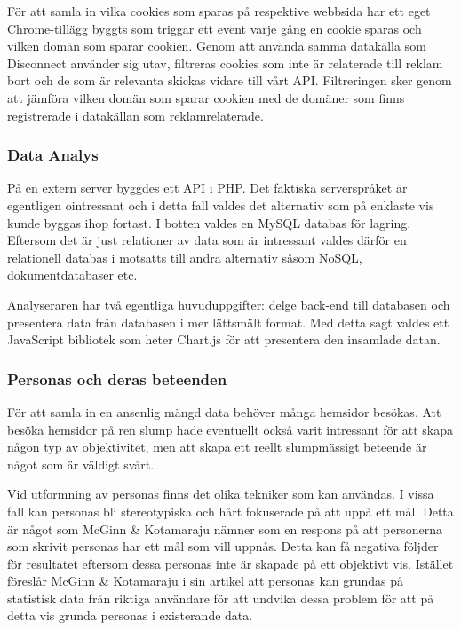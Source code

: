 \documentclass[a4paper,11pt]{article}
\begin{document}
{För att samla in vilka cookies som sparas på respektive webbsida har ett eget Chrome-tillägg byggts som triggar ett event varje gång en cookie sparas och vilken domän som sparar cookien. Genom att använda samma datakälla som Disconnect använder sig utav, filtreras cookies som inte är relaterade till reklam bort och de som är relevanta skickas vidare till vårt API. Filtreringen sker genom att jämföra vilken domän som sparar cookien med de domäner som finns registrerade i datakällan som reklamrelaterade.

\subsubsection{Data Analys}
På en extern server byggdes ett API i PHP. Det faktiska serverspråket är egentligen  ointressant och i detta fall valdes det alternativ som på enklaste vis kunde byggas ihop fortast. I botten valdes en MySQL databas för lagring. Eftersom det är just relationer av data som är intressant valdes därför en relationell databas i motsatts till andra alternativ såsom NoSQL, dokumentdatabaser etc. 

Analyseraren har två egentliga huvuduppgifter: delge back-end till databasen och presentera data från databasen i mer lättsmält format. Med detta sagt valdes ett JavaScript bibliotek som heter Chart.js \cite{Downie} för att presentera den insamlade datan. 

\subsubsection{Personas och deras beteenden}
För att samla in en ansenlig mängd data behöver många hemsidor besökas. Att besöka hemsidor på ren slump hade eventuellt också varit intressant för att skapa någon typ av objektivitet, men att skapa ett reellt slumpmässigt beteende är något som är väldigt svårt.

Vid utformning av personas finns det olika tekniker som kan användas. I vissa fall kan personas bli stereotypiska och hårt fokuserade på att uppå ett mål. Detta är något som McGinn \& Kotamaraju \cite{McGinn} nämner som en respons på att personerna som skrivit personas har ett mål som vill uppnås. Detta kan få negativa följder för resultatet eftersom dessa personas inte är skapade på ett objektivt vis. Istället föreslår McGinn \& Kotamaraju \cite{McGinn} i sin artikel att personas kan grundas på statistisk data från riktiga användare för att undvika dessa problem för att på detta vis grunda personas i existerande data.

}
\end{document}
